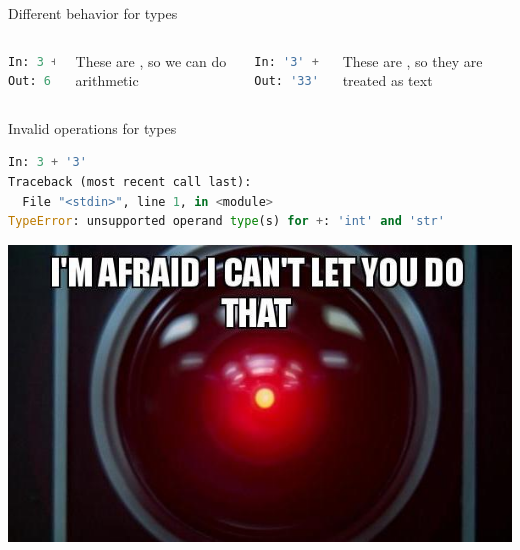 \documentclass[aspectratio=169,usenames,dvipsnames]{beamer}
\begin{document}
\begin{frame}[fragile]{Different behavior for types}
    \begin{columns}
\begin{lstlisting}[language=python]
In: 3 + 3
Out: 6
\end{lstlisting}

These are , so we can do arithmetic
\begin{lstlisting}[language=python]
In: '3' + '3'
Out: '33'
\end{lstlisting}

These are , so they are treated as text
    \end{columns}
\end{frame}

\begin{frame}[fragile]{Invalid operations for types}
\begin{lstlisting}[language=python]
In: 3 + '3'
Traceback (most recent call last):
  File "<stdin>", line 1, in <module>
TypeError: unsupported operand type(s) for +: 'int' and 'str'
\end{lstlisting}
    
    \centering
    \includegraphics[height=0.5\textheight]{fig/cantdothat}
\end{frame}
    
\end{document}
